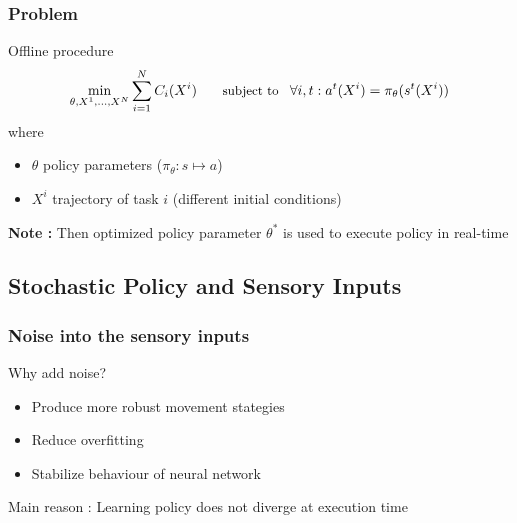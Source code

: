 \documentclass[mathserif]{beamer}
\begin{document}
\begin{frame}
  \frametitle{{Problem}}
  \begin{block}{Offline procedure}
  \begin{align}
  \min_{\theta,X^1,...,X^N} \sum\limits_{i=1}^{N} C_{i}(X^{i}) \hspace{15pt}\text{ \small subject to } \hspace{5pt} \forall i,t : a^{t}(X^{i}) = \pi_{\theta}(s^{t}(X^{i}))
  \end{align}
  where 
  \begin{itemize}
  \item $\theta$ policy parameters ($\pi_{\theta} : s \mapsto a$) 
  \item $X^{i}$ trajectory of task $i$ (different initial conditions)
  \end{itemize}
  \end{block}

\vspace{20pt}

\textbf{Note :} Then optimized policy parameter $\theta^{*}$ is used to execute policy in real-time

\end{frame}


\subsection{Stochastic Policy and Sensory Inputs}

\begin{frame}
  \frametitle{{Noise into the sensory inputs}}
  \begin{block}{Why add noise?}
  \begin{itemize}
  \item Produce more robust movement stategies \cite{huh2009real} \cite{wang2010optimizing}
  \item Reduce overfitting \cite{hinton2012improving}
  \item Stabilize behaviour of neural network \cite{hoerzer2014emergence}
  \end{itemize}
  Main reason :  Learning policy does not diverge at execution time
  \end{block}
\end{frame}


\end{document}
